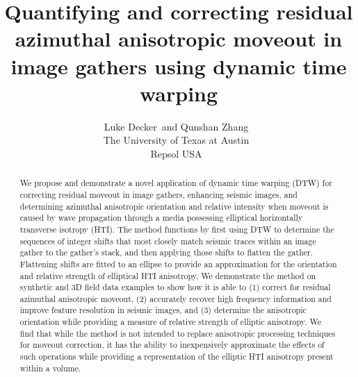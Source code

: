 
\title{Quantifying and correcting residual azimuthal anisotropic moveout in image gathers using dynamic time warping}

\author{Luke Decker~\footnotemark[1] and Qunshan Zhang~\footnotemark[2]\\
\footnotemark[1] The University of Texas at Austin~ \\ 
\footnotemark[2] Repsol USA~}
\maketitle
\address{
Oden Institute for Computational Engineering and Sciences \\
The University of Texas at Austin \\
201 E 24th St, \\
Austin, TX 78712 \\
decker.luke@utexas.edu
}

\begin{abstract}
We propose and demonstrate a novel application of dynamic time warping (DTW) for correcting residual moveout in image gathers, enhancing seismic images, and determining azimuthal anisotropic orientation and relative intensity when moveout is caused by wave propagation through a media possessing elliptical horizontally transverse isotropy (HTI).  The method functions by first using DTW to determine the sequences of integer shifts that most closely match seismic traces within an image gather to the gather's stack, and then applying those shifts to flatten the gather.  Flattening shifts are fitted to an ellipse to provide an approximation for the orientation and relative strength of elliptical HTI anisotropy. We demonstrate the method on synthetic and 3D field data examples to show how it is able to (1) correct for residual azimuthal anisotropic moveout, (2) accurately recover high frequency information  and improve feature resolution in seismic images, and (3) determine the anisotropic orientation while providing a measure of relative strength of elliptic anisotropy.  We find that while the method is not intended to replace  anisotropic processing techniques for moveout correction, it has the ability to inexpensively approximate the effects of such operations while providing a representation of the elliptic HTI anisotropy present within a volume.

\end{abstract}

